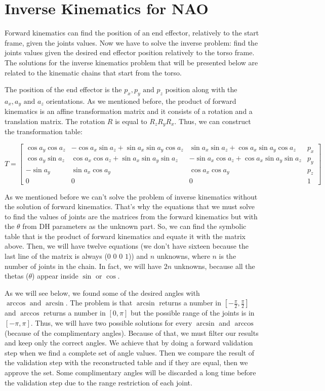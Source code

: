 \section{Inverse Kinematics for NAO}
Forward kinematics can find the position of an end effector, relatively to the start frame, given the joints values. Now we have to solve the inverse problem: find the joints values given the desired end effector position relatively to the torso frame. The solutions for the inverse kinematics problem that will be presented below are related to the kinematic chains that start from the torso.

The position of the end effector is the $p_x,p_y\text{ and }p_z$ position along with the $a_x,a_y\text{ and }a_z$ orientations. As we mentioned before, the product of forward kinematics is an affine transformation matrix and it consists of a rotation and a translation matrix. The rotation $R$ is equal to $R_zR_yR_x$. Thus, we can construct the transformation table:

\begin{scriptsize}
\[
T = 
\begin{bmatrix}
\cos a_y\cos a_z & -\cos a_x\sin a_z + \sin a_x\sin a_y\cos a_z & \sin a_x\sin a_z + \cos a_x\sin a_y\cos a_z & p_x\\
\cos a_y\sin a_z & \cos a_x\cos a_z + \sin a_x\sin a_y\sin a_z & -\sin a_x\cos a_z + \cos a_x\sin a_y\sin a_z & p_y\\
-\sin a_y & \sin a_x\cos a_y & \cos a_x\cos a_y & p_z\\
0 & 0 & 0 & 1
\end{bmatrix}
\]
\end{scriptsize}
As we mentioned before we can't solve the problem of inverse kinematics without the solution of forward kinematics. That's why the equations that we must solve to find the values of joints are the matrices from the forward kinematics but with the $\theta$ from DH parameters as the unknown part. So, we can find the symbolic table that is the product of forward kinematics and equate it with the matrix above. Then, we will have twelve equations (we don't have sixteen because the last line of the matrix is always ($0$ $0$ $0$ $1$)) and $n$ unknowns, where $n$ is the number of joints in the chain. In fact, we will have $2n$ unknowns, because all the thetas ($\theta$) appear inside $\sin$ or $\cos$.

As we will see below, we found some of the desired angles with $\arccos \text{ and }\arcsin$. The problem is that $\arcsin$ returns a number in $\left[-\tfrac{\pi}{2},\tfrac{\pi}{2}\right]$ and $\arccos$ returns a number in $\left[0,\pi\right]$ but the possible range of the joints is in $\left[-\pi,\pi\right]$. Thus, we will have two possible solutions for every $\arcsin$ and $\arccos$ (because of the complimentary angles). Because of that, we must filter our results and keep only the correct angles. We achieve that by doing a forward validation step when we find a complete set of angle values. Then we compare the result of the validation step with the reconstructed table and if they are equal, then we approve the set. Some complimentary angles will be discarded a long time before the validation step due to the range restriction of each joint.

